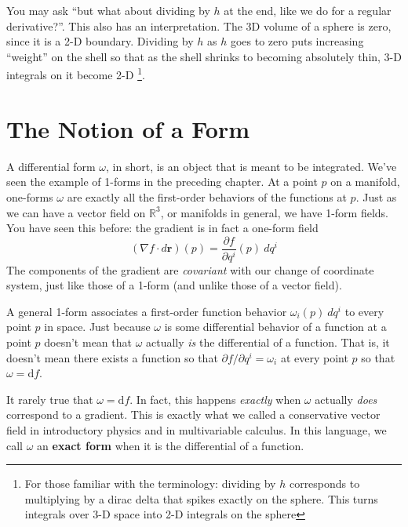 	You may ask ``but what about dividing by $h$ at the end, like we do for a regular derivative?''. This also has an interpretation. The 3D volume of a sphere is zero, since it is a 2-D boundary. Dividing by $h$ as $h$ goes to zero puts increasing ``weight'' on the shell so that as the shell shrinks to becoming absolutely thin, 3-D integrals on it become 2-D \footnote{For those familiar with the terminology: dividing by $h$ corresponds to multiplying by a dirac delta that spikes exactly on the sphere. This turns integrals over 3-D space into 2-D integrals on the sphere}.
	
	
	
\section{The Notion of a Form}

	A differential form $\omega$, in short, is an object that is meant to be integrated. We've seen the example of 1-forms in the preceding chapter. At a point $p$ on a manifold, one-forms $\omega$ are exactly all the first-order behaviors of the functions at $p$. Just as we can have a vector field on $\mathbb{R}^3$, or manifolds in general, we have 1-form fields. You have seen this before: the gradient is in fact a one-form field
	\begin{equation}
		(\nabla f \cdot d\mathbf r) (p) = \frac{\partial f}{\partial q^i}(p)~ dq^i
	\end{equation}
	The components of the gradient are \emph{covariant} with our change of coordinate system, just like those of a 1-form (and unlike those of a vector field). 
	
	A general 1-form associates a first-order function behavior $\omega_i(p)~ dq^i$ to every point $p$ in space. Just because $\omega$ is some differential behavior of a function at a point $p$ doesn't mean that $\omega$ actually \emph{is} the differential of a function. That is, it doesn't mean there exists a function so that $\partial f/\partial q^i = \omega_i$ at every point $p$ so that $\omega = \mathrm df$.
	
	It rarely true that $\omega = \mathrm df$. In fact, this happens \emph{exactly} when $\omega$ actually \emph{does} correspond to a gradient. This is exactly what we called a conservative vector field in introductory physics and in multivariable calculus. In this language, we call $\omega$ an \textbf{exact form} when it is the differential of a function.
	
